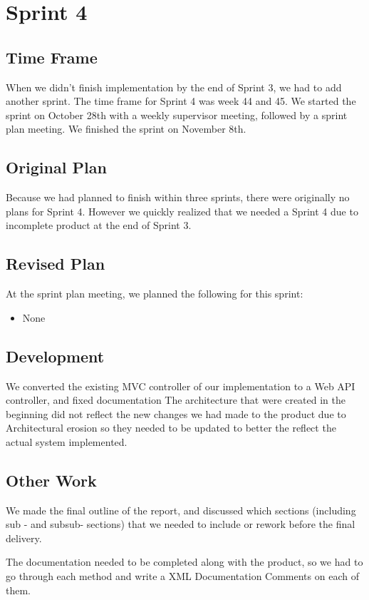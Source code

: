 \section{Sprint 4}

\subsection{Time Frame}
When we didn't finish implementation by the end of Sprint 3, we had to add another sprint. The time frame for Sprint 4 was week 44 and 45. We started the sprint on October 28th with a weekly supervisor meeting, followed by a sprint plan meeting. We finished the sprint on November 8th.

\subsection{Original Plan}
Because we had planned to finish within three sprints, there were originally no plans for Sprint 4. However we quickly realized that we needed a Sprint 4 due to incomplete product at the end of Sprint 3.

\subsection{Revised Plan}
At the sprint plan meeting, we planned the following for this sprint:
\begin{itemize}
	\item None
\end{itemize}


\subsection{Development}
We converted the existing MVC controller of our implementation to a Web API controller, and fixed documentation
The architecture that were created in the beginning did not reflect the new changes we had made to the product due to Architectural erosion so they needed to be updated to better the reflect the actual system implemented.

\subsection{Other Work}
We made the final outline of the report, and discussed which sections (including sub - and subsub- sections) that we needed to include or rework before the final delivery.

The documentation needed to be completed along with the product, so we had to go through each method and write a XML Documentation Comments on each of them.

